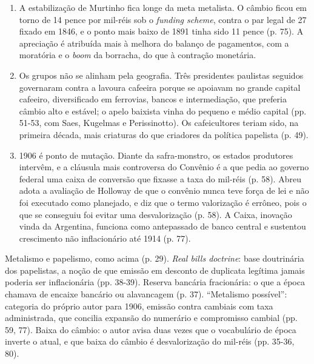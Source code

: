 \begin{enumerate}[leftmargin=*,nosep]
\item A estabilização de Murtinho fica longe da meta metalista. O câmbio ficou em
torno de 14 pence por mil-réis sob o \emph{funding scheme}, contra o par legal de
27 fixado em 1846, e o ponto mais baixo de 1891 tinha sido 11 pence (p. 75). A
apreciação é atribuída mais à melhora do balanço de pagamentos, com a moratória e
o \emph{boom} da borracha, do que à contração monetária.


\item Os grupos não se alinham pela geografia. Três presidentes paulistas
seguidos governaram contra a lavoura cafeeira porque se apoiavam no grande
capital cafeeiro, diversificado em ferrovias, bancos e intermediação, que preferia
câmbio alto e estável; o apelo baixista vinha do pequeno e médio capital
(pp. 51-53, com Saes, Kugelmas e Perissinotto). Os cafeicultores teriam sido, na
primeira década, mais criaturas do que criadores da política papelista (p. 49).

\item 1906 é ponto de mutação. Diante da safra-monstro, os estados produtores
intervêm, e a cláusula mais controversa do Convênio é a que pedia ao governo
federal uma caixa de conversão que fixasse a taxa do mil-réis (p. 58). Abreu adota
a avaliação de Holloway de que o convênio nunca teve força de lei e não foi
executado como planejado, e diz que o termo valorização é errôneo, pois o que se
conseguiu foi evitar uma desvalorização (p. 58). A Caixa, inovação vinda da
Argentina, funciona como antepassado de banco central e sustentou crescimento não
inflacionário até 1914 (p. 77).
\end{enumerate}

Metalismo e papelismo, como acima (p. 29). \emph{Real bills doctrine}: base
doutrinária dos papelistas, a noção de que emissão em desconto de duplicata
legítima jamais poderia ser inflacionária (pp. 38-39). Reserva bancária
fracionária: o que a época chamava de encaixe bancário ou alavancagem (p. 37).
``Metalismo possível'': categoria do próprio autor para 1906, emissão contra
cambiais com taxa administrada, que concilia expansão do numerário e compromisso
cambial (pp. 59, 77). Baixa do câmbio: o autor avisa duas vezes que o vocabulário
de época inverte o atual, e que baixa do câmbio é desvalorização do mil-réis
(pp. 35-36, 80).

